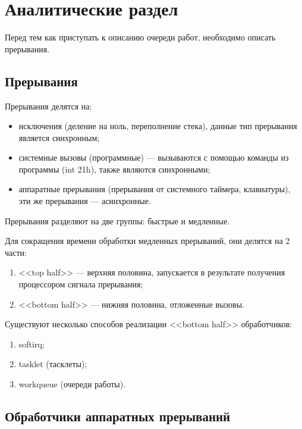 \section{\large Аналитические раздел}

Перед тем как приступать к описанию очереди работ, необходимо описать прерывания.

\subsection{Прерывания}

Прерывания делятся на:

\begin{itemize}
    \item исключения (деление на ноль, переполнение стека), данные тип прерывания является синхронным;
    \item системные вызовы (программные) --- вызываются с помощью команды из программы (int 21h), также являются синхронными;
    \item аппаратные прерывания (прерывания от системного таймера, клавиатуры), эти же прерывания --- асинхронные.
\end{itemize}

Прерывания разделяют на две группы: быстрые и медленные.

Для сокращения времени обработки медленных прерываний, они делятся на 2 части:

\begin{enumerate}
    \item <<top half>> --- верхняя половина, запускается в результате получения процессором сигнала прерывания;
    \item <<bottom half>> --- нижняя половина, отложенные вызовы.
\end{enumerate}

Существуют несколько способов реализации <<bottom half>> обработчиков:

\begin{enumerate}
    \item softirq;
    \item tasklet (тасклеты);
    \item workqueue (очереди работы).
\end{enumerate}

\subsection{Обработчики аппаратных прерываний}

